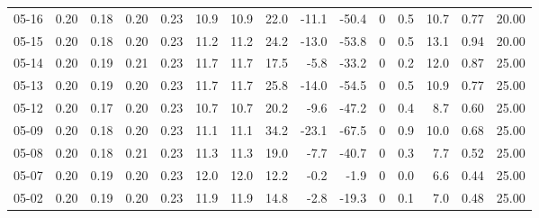 \begin{threeparttable}
{\begin{tabular}{lrrrrrrrrrrrrrr}
  05-16 &          0.20 &          0.18 &          0.20 &        0.23 &                10.9 &               10.9 &                22.0 &      -11.1 &        -50.4 &              0 &                 0.5 &             10.7 &            0.77 &                  20.00 \\
  05-15 &          0.20 &          0.18 &          0.20 &        0.23 &                11.2 &               11.2 &                24.2 &      -13.0 &        -53.8 &              0 &                 0.5 &             13.1 &            0.94 &                  20.00 \\
  05-14 &          0.20 &          0.19 &          0.21 &        0.23 &                11.7 &               11.7 &                17.5 &       -5.8 &        -33.2 &              0 &                 0.2 &             12.0 &            0.87 &                  25.00 \\
  05-13 &          0.20 &          0.19 &          0.20 &        0.23 &                11.7 &               11.7 &                25.8 &      -14.0 &        -54.5 &              0 &                 0.5 &             10.9 &            0.77 &                  25.00 \\
  05-12 &          0.20 &          0.17 &          0.20 &        0.23 &                10.7 &               10.7 &                20.2 &       -9.6 &        -47.2 &              0 &                 0.4 &              8.7 &            0.60 &                  25.00 \\
  05-09 &          0.20 &          0.18 &          0.20 &        0.23 &                11.1 &               11.1 &                34.2 &      -23.1 &        -67.5 &              0 &                 0.9 &             10.0 &            0.68 &                  25.00 \\
  05-08 &          0.20 &          0.18 &          0.21 &        0.23 &                11.3 &               11.3 &                19.0 &       -7.7 &        -40.7 &              0 &                 0.3 &              7.7 &            0.52 &                  25.00 \\
  05-07 &          0.20 &          0.19 &          0.20 &        0.23 &                12.0 &               12.0 &                12.2 &       -0.2 &         -1.9 &              0 &                 0.0 &              6.6 &            0.44 &                  25.00 \\
  05-02 &          0.20 &          0.19 &          0.20 &        0.23 &                11.9 &               11.9 &                14.8 &       -2.8 &        -19.3 &              0 &                 0.1 &              7.0 &            0.48 &                  25.00 \\

\end{tabular}}
\end{threeparttable}
